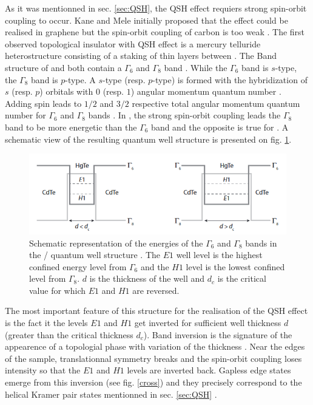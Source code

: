 As it was mentionned in sec. \ref{sec:QSH}, the QSH effect requiers strong spin-orbit coupling to occur. Kane and Mele initially proposed that the effect could be realised in graphene but the spin-orbit coupling of carbon is too weak \cite{cayssol_topological_2021}. The first observed topological insulator with QSH effect is a mercury telluride heterostructure consisting of a staking of thin  layers between  \cite{kane_this_2011}. The Band structure of  and  both contain a $\Gamma_6$ and $\Gamma_8$ band \cite{bernevig_topological_2013}. While the $\Gamma_6$ band is $s$-type, the $\Gamma_8$ band is $p$-type. A $s$-type (resp. $p$-type) is formed with the hybridization of $s$ (resp. $p$) orbitals with $0$ (resp. $1$) angular momentum quantum number \cite{girvin_modern_2019}. Adding spin leads to $1/2$ and $3/2$ respective total angular momentum quantum number for $\Gamma_6$ and $\Gamma_8$ bands \cite{bernevig_topological_2013}. In , the strong spin-orbit coupling leads the $\Gamma_8$ band to be more energetic than the $\Gamma_6$ band and the opposite is true for  \cite{buhmann_quantum_2011}. A schematic view of the resulting quantum well structure is presented on fig. \ref{hg}.
\begin{figure}[h!]
    \includegraphics[scale=0.8]{sections/visuel/Hg}
    \caption{Schematic representation of the energies of the $\Gamma_6$ and $\Gamma_8$ bands in the / quantum well structure \cite{bernevig_topological_2013}. The  $E1$ well level is the highest confined energy level from $\Gamma_6$ and the $H1$ level is the lowest confined level from $\Gamma_8$. $d$ is the thickness of the well and $d_c$ is the critical value for which $E1$ and $H1$ are reversed.}
    \label{hg}
\end{figure}
The most important feature of this structure for the realisation of the QSH effect is the fact it the levels $E1$ and $H1$ get inverted for sufficient well thickness $d$ (greater than the critical thickness $d_c$). Band inversion is the signature of the appearence of a topologial phase with variation of the thickness \cite{bansil_colloquium_2016}. Near the edges of the sample, translationnal symmetry breaks and the spin-orbit coupling loses intensity so that the $E1$ and $H1$ levels are inverted back. Gapless edge states emerge from this inversion (see fig. \ref{cross}) and they precisely correspond to the helical Kramer pair states mentionned in sec. \ref{sec:QSH} \cite{buhmann_quantum_2011}.  

